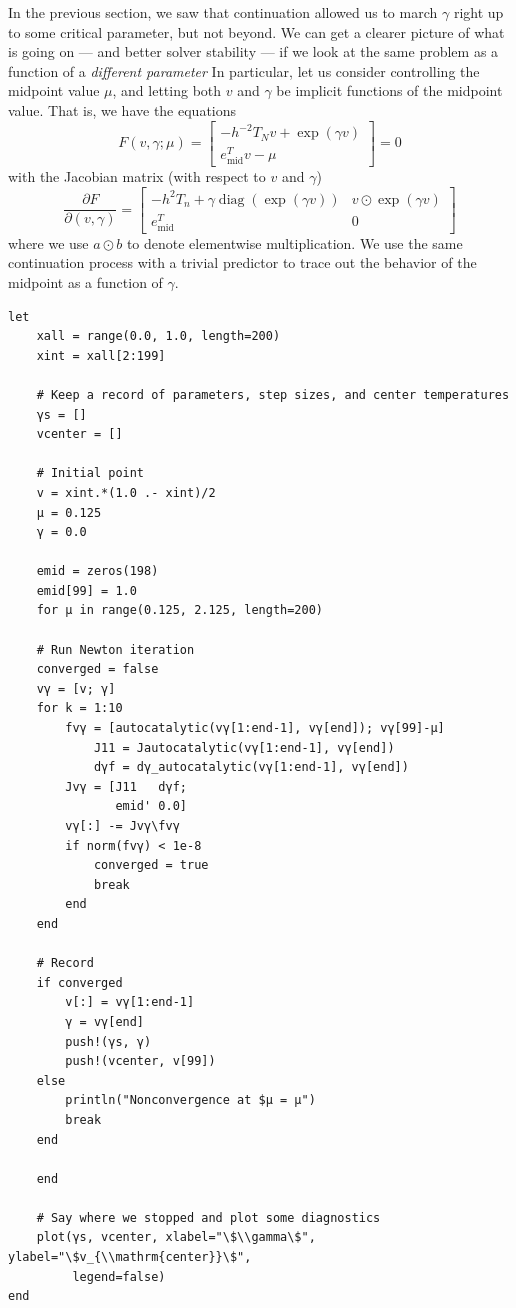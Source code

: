 \documentclass[12pt, leqno]{article} %
\begin{document}
In the previous section, we saw that continuation allowed us to march
\(\gamma\) right up to some critical parameter, but not beyond. We can
get a clearer picture of what is going on --- and better solver
stability --- if we look at the same problem as a function of a
\emph{different parameter} In particular, let us consider controlling
the midpoint value \(\mu\), and letting both \(v\) and \(\gamma\) be
implicit functions of the midpoint value. That is, we have the equations
\[F(v,\gamma; \mu) =
  \begin{bmatrix}
    -h^{-2} T_N v + \exp(\gamma v) \\
    e_{\mathrm{mid}}^T v - \mu
  \end{bmatrix} = 0\] with the Jacobian matrix (with respect to \(v\)
and \(\gamma\)) \[\frac{\partial F}{\partial (v,\gamma)} =
  \begin{bmatrix}
    -h^2 T_n + \gamma \operatorname{diag}(\exp(\gamma v)) &
    v \odot \exp(\gamma v) \\
    e_{\mathrm{mid}}^T & 0
  \end{bmatrix}\] where we use \(a \odot b\) to denote elementwise
multiplication. We use the same continuation process with a trivial
predictor to trace out the behavior of the midpoint as a function of
\(\gamma\).

\begin{verbatim}
let
    xall = range(0.0, 1.0, length=200)
    xint = xall[2:199]
    
    # Keep a record of parameters, step sizes, and center temperatures
    γs = []
    vcenter = []
    
    # Initial point
    v = xint.*(1.0 .- xint)/2
    μ = 0.125
    γ = 0.0
    
    emid = zeros(198)
    emid[99] = 1.0
    for μ in range(0.125, 2.125, length=200)
        
	# Run Newton iteration
	converged = false
	vγ = [v; γ]
	for k = 1:10
	    fvγ = [autocatalytic(vγ[1:end-1], vγ[end]); vγ[99]-μ]
            J11 = Jautocatalytic(vγ[1:end-1], vγ[end])
            dγf = dγ_autocatalytic(vγ[1:end-1], vγ[end])
	    Jvγ = [J11   dγf;
	           emid' 0.0]
	    vγ[:] -= Jvγ\fvγ
	    if norm(fvγ) < 1e-8
	        converged = true
	        break
	    end
	end
        
	# Record
	if converged
	    v[:] = vγ[1:end-1]
	    γ = vγ[end]
	    push!(γs, γ)
	    push!(vcenter, v[99])
	else
	    println("Nonconvergence at $μ = μ")
	    break
	end
        
    end
    
    # Say where we stopped and plot some diagnostics
    plot(γs, vcenter, xlabel="\$\\gamma\$", ylabel="\$v_{\\mathrm{center}}\$",
         legend=false)
end
\end{verbatim}
\end{document}
